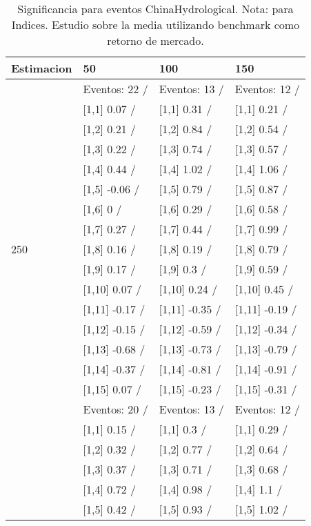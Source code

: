 \begin{table}

\caption{Significancia para eventos ChinaHydrological. Nota: para Indices. Estudio sobre la media utilizando benchmark como retorno de mercado.}
\centering
\begin{tabular}[t]{llll}
\toprule
Estimacion & 50 & 100 & 150\\
\midrule
 & Eventos:  22 / & Eventos:  13 / & Eventos:  12 /\\
 & {}[1,1] 0.07  / & {}[1,1] 0.31  / & {}[1,1] 0.21  /\\
 & {}[1,2] 0.21  / & {}[1,2] 0.84  / & {}[1,2] 0.54  /\\
 & {}[1,3] 0.22  / & {}[1,3] 0.74  / & {}[1,3] 0.57  /\\
 & {}[1,4] 0.44  / & {}[1,4] 1.02  / & {}[1,4] 1.06  /\\
\addlinespace
 & {}[1,5] -0.06  / & {}[1,5] 0.79  / & {}[1,5] 0.87  /\\
 & {}[1,6] 0  / & {}[1,6] 0.29  / & {}[1,6] 0.58  /\\
 & {}[1,7] 0.27  / & {}[1,7] 0.44  / & {}[1,7] 0.99  /\\
250 & {}[1,8] 0.16  / & {}[1,8] 0.19  / & {}[1,8] 0.79  /\\
 & {}[1,9] 0.17  / & {}[1,9] 0.3  / & {}[1,9] 0.59  /\\
\addlinespace
 & {}[1,10] 0.07  / & {}[1,10] 0.24  / & {}[1,10] 0.45  /\\
 & {}[1,11] -0.17  / & {}[1,11] -0.35  / & {}[1,11] -0.19  /\\
 & {}[1,12] -0.15  / & {}[1,12] -0.59  / & {}[1,12] -0.34  /\\
 & {}[1,13] -0.68  / & {}[1,13] -0.73  / & {}[1,13] -0.79  /\\
 & {}[1,14] -0.37  / & {}[1,14] -0.81  / & {}[1,14] -0.91  /\\
\addlinespace
 & {}[1,15] 0.07  / & {}[1,15] -0.23  / & {}[1,15] -0.31  /\\
 & Eventos:  20 / & Eventos:  13 / & Eventos:  12 /\\
 & {}[1,1] 0.15  / & {}[1,1] 0.3  / & {}[1,1] 0.29  /\\
 & {}[1,2] 0.32  / & {}[1,2] 0.77  / & {}[1,2] 0.64  /\\
 & {}[1,3] 0.37  / & {}[1,3] 0.71  / & {}[1,3] 0.68  /\\
\addlinespace
 & {}[1,4] 0.72  / & {}[1,4] 0.98  / & {}[1,4] 1.1  /\\
 & {}[1,5] 0.42  / & {}[1,5] 0.93  / & {}[1,5] 1.02  /\\

\end{tabular}
\end{table}
